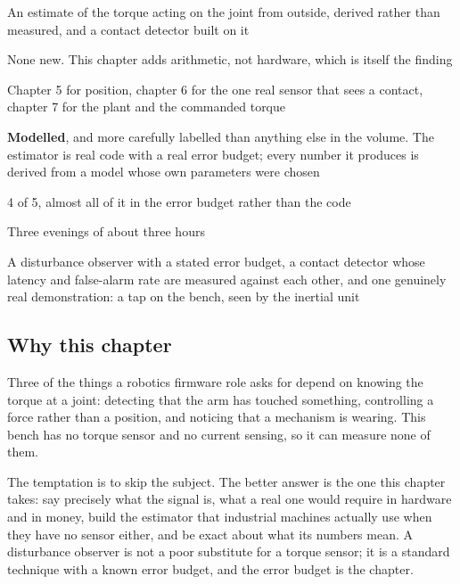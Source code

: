 
\begin{keyfacts}
\item[Adds to the node] An estimate of the torque acting on the joint from outside, derived rather than measured, and a contact detector built on it
\item[Peripherals] None new. This chapter adds arithmetic, not hardware, which is itself the finding
\item[Depends on] Chapter 5 for position, chapter 6 for the one real sensor that sees a contact, chapter 7 for the plant and the commanded torque
\item[Real or modelled] \textbf{Modelled}, and more carefully labelled than anything else in the volume. The estimator is real code with a real error budget; every number it produces is derived from a model whose own parameters were chosen
\item[Difficulty] 4 of 5, almost all of it in the error budget rather than the code
\item[Effort] Three evenings of about three hours
\item[Deliverable] A disturbance observer with a stated error budget, a contact detector whose latency and false-alarm rate are measured against each other, and one genuinely real demonstration: a tap on the bench, seen by the inertial unit
\end{keyfacts}

\subsection*{Why this chapter}

Three of the things a robotics firmware role asks for depend on knowing the
torque at a joint: detecting that the arm has touched something, controlling a
force rather than a position, and noticing that a mechanism is wearing. This
bench has no torque sensor and no current sensing, so it can measure none of
them.

The temptation is to skip the subject. The better answer is the one this chapter
takes: say precisely what the signal is, what a real one would require in
hardware and in money, build the estimator that industrial machines actually use
when they have no sensor either, and be exact about what its numbers mean. A
disturbance observer is not a poor substitute for a torque sensor; it is a
standard technique with a known error budget, and the error budget is the
chapter.

